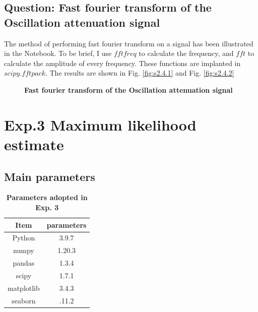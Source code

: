 \documentclass[12pt,a4paper,UTF8]{article}
\begin{document}
    \subsection{Question: Fast fourier transform of the Oscillation attenuation signal}
    The method of performing fast fourier transform on a signal has been illustrated in the Notebook.
    To be brief, I use $fftfreq$ to calculate the frequency, and $fft$ to calculate the amplitude of every frequency.
    These functions are implanted in $scipy.fftpack$. The results are shown in Fig. \ref{fig:s2.4.1} and Fig. \ref{fig:s2.4.2}
    \begin{figure}[htbp]
        \centering
        \caption{\textbf{Fast fourier transform of the Oscillation attenuation signal}}
    \end{figure}


\section{Exp.3 Maximum likelihood estimate}
    \subsection{Main parameters}
    \begin{table}[htbp]
        \centering
            \begin{tabular}{cc}
                \toprule
                Item &parameters  \\
                \midrule
                Python &3.9.7 \\
                numpy  &1.20.3 \\
                pandas  &1.3.4 \\
                scipy  &1.7.1 \\
                matplotlib  &3.4.3 \\
                seaborn  &.11.2 \\           
                \bottomrule
            \end{tabular}
            \caption{\textbf{Parameters adopted in Exp. 3}}
            \label{tab:3.1}
    \end{table}	
\end{document}
